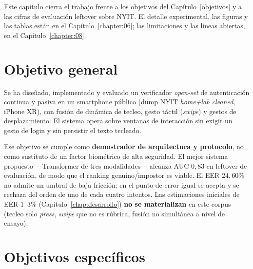 Este capítulo cierra el trabajo frente a los objetivos del Capítulo~\ref{objetivos} y a las cifras de
evaluación leftover sobre NYIT. El detalle experimental, las figuras y las tablas están en el
Capítulo~\ref{chapter:06}; las limitaciones y las líneas abiertas, en el Capítulo~\ref{chapter:08}.

\section{Objetivo general}

Se ha diseñado, implementado y evaluado un verificador \textit{open-set} de autenticación continua y pasiva
en un smartphone público (dump NYIT \textit{home+lab cleaned}, iPhone XR), con fusión de dinámica de tecleo,
gesto táctil (\textit{swipe}) y gestos de desplazamiento. El sistema opera sobre ventanas de interacción
sin exigir un gesto de login y sin persistir el texto tecleado.

Ese objetivo se cumple como \textbf{demostrador de arquitectura y protocolo}, no como sustituto de un factor
biométrico de alta seguridad. El mejor sistema propuesto ---Transformer de tres modalidades--- alcanza AUC
$0{,}83$ en leftover de evaluación, de modo que el ranking genuino/impostor es viable. El EER $24{,}60\%$
no admite un umbral de baja fricción: en el punto de error igual se acepta y se rechaza del orden de uno
de cada cuatro intentos. Las estimaciones iniciales de EER $1$--$3\%$ (Capítulo~\ref{chap:desarrollo})
\textbf{no se materializan} en este corpus (tecleo solo \textit{press}, \textit{swipe} que no es rúbrica, fusión no
simultánea a nivel de ensayo).

\section{Objetivos específicos}

